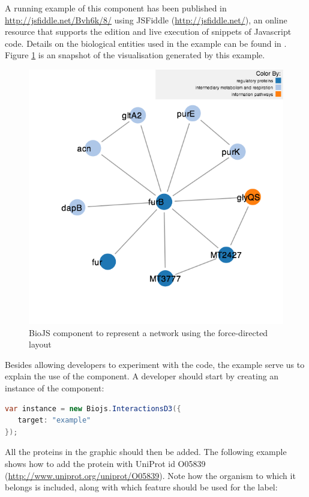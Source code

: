 A running example of this component has been published in \url{http://jsfiddle.net/Bvh6k/8/} using JSFiddle (\url{http://jsfiddle.net/}), an online resource that supports the edition and live execution of snippets of Javascript code. Details on the biological entities used in the example can be found in \cite{SAL2014}. Figure \ref{fig:biojs_force} is an snapshot of the visualisation generated by this example. 

\begin{figure}[ht]
\centering
\includegraphics[width=5in]{figures/force.png}
\caption[BioJS component to represent a network using the force-directed layout]{BioJS component to represent a network using the force-directed layout
\label{fig:biojs_force}}
\end{figure}

Besides allowing developers to experiment with the code, the example serve us to explain the use of the component. A developer should start by creating an instance of the component:

\begin{lstlisting}[language=java]
var instance = new Biojs.InteractionsD3({
   target: "example"
});
\end{lstlisting}
					
All the proteins in the graphic should then be added. The following example shows how to add the protein with UniProt id O05839 (\url{http://www.uniprot.org/uniprot/O05839}). Note how the organism to which it belongs is included, along with which feature should be used for the label:

